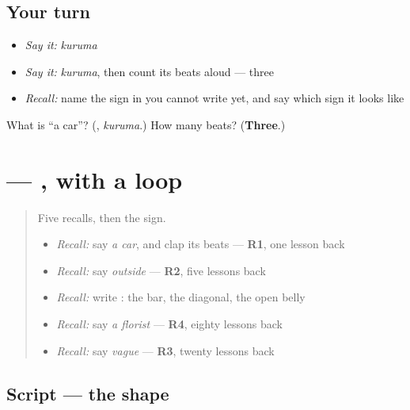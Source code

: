 \subsection*{Your turn}
\begin{itemize}
\raggedright
  \item \emph{Say it:} \emph{kuruma}
  \item \emph{Say it:} \emph{kuruma}, then count its beats aloud — three
  \item \emph{Recall:} name the sign in \textbf{} you cannot write yet, and say which sign it looks like
\end{itemize}

\begin{tcolorbox}[breakable,colback=teal!4,colframe=teal!35!black,title={Before you move on}]
What is \textquotedblleft{}a car\textquotedblright{}? (\textbf{}, \emph{kuruma}.) How many beats? (\textbf{Three}.)
\end{tcolorbox}
\section[\texorpdfstring{\ja{る} (ru)}{る (ru)}]{ — , with a loop}

\label{lesson:JA-W132-ru}



\begin{quote}
Five recalls, then the sign.

\begin{itemize}
\raggedright
  \item \emph{Recall:} say \emph{a car}, and clap its beats — \textbf{R1}, one lesson back
  \item \emph{Recall:} say \emph{outside} — \textbf{R2}, five lessons back
  \item \emph{Recall:} write \textbf{}: the bar, the diagonal, the open belly
  \item \emph{Recall:} say \emph{a florist} — \textbf{R4}, eighty lessons back
  \item \emph{Recall:} say \emph{vague} — \textbf{R3}, twenty lessons back
\end{itemize}
\end{quote}

\subsection*{Script — the shape}

